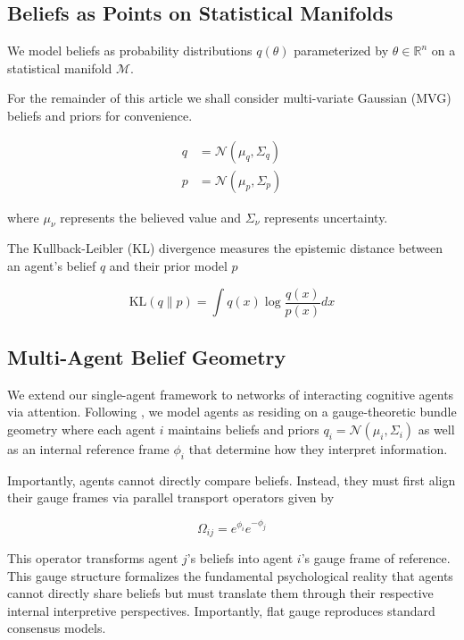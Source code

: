 \documentclass[12pt]{article}
\begin{document}
\subsection{Beliefs as Points on Statistical Manifolds}

We model beliefs as probability distributions $q(\theta)$ parameterized by $\theta \in \mathbb{R}^n$ on a statistical manifold $\mathcal{M}$. 

For the remainder of this article we shall consider multi-variate Gaussian (MVG) beliefs and priors for convenience.


\begin{align}
q &= \mathcal{N}(\mu_q, \Sigma_q) \\
p &= \mathcal{N}(\mu_p, \Sigma_p)
\end{align}

where $\mu_\nu$ represents the believed value and $\Sigma_\nu$ represents uncertainty.

The Kullback-Leibler (KL) divergence measures the epistemic distance between an agent's belief $q$ and their prior model $p$

\begin{equation}
\text{KL}(q \| p) = \int q(x) \log \frac{q(x)}{p(x)} dx
\end{equation}



\subsection{Multi-Agent Belief Geometry}

We extend our single-agent framework to networks of interacting cognitive agents via attention. Following \citet{Dennis2025}, we model agents as residing on a gauge-theoretic bundle geometry where each agent $i$ maintains beliefs and priors $q_i = \mathcal{N}(\mu_i, \Sigma_i)$ as well as an internal reference frame $\phi_i$ that determine how they interpret information.

Importantly, agents cannot directly compare beliefs. Instead, they must first align their gauge frames via parallel transport operators given by

\begin{equation}
\Omega_{ij} = e^{\phi_i}e^{-\phi_j}
\end{equation}

 

This operator transforms agent $j$'s beliefs into agent $i$'s gauge frame of reference. This gauge structure formalizes the fundamental psychological reality that agents cannot directly share beliefs but must translate them through their respective internal interpretive perspectives. Importantly, flat gauge reproduces standard consensus models.
\end{document}

